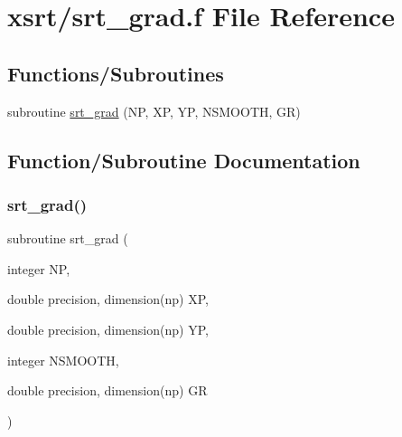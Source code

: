 \hypertarget{srt__grad_8f}{}\section{xsrt/srt\+\_\+grad.f File Reference}
\label{srt__grad_8f}
\subsection*{Functions/\+Subroutines}
\begin{DoxyCompactItemize}
\item 
subroutine \hyperlink{srt__grad_8f_a52c2cfa91858ed4f6dd6f4f4f5139b69}{srt\+\_\+grad} (NP, XP, YP, N\+S\+M\+O\+O\+TH, GR)
\end{DoxyCompactItemize}


\subsection{Function/\+Subroutine Documentation}
\mbox{\label{srt__grad_8f_a52c2cfa91858ed4f6dd6f4f4f5139b69}} 
\subsubsection{\texorpdfstring{srt\+\_\+grad()}{srt\_grad()}}
{\footnotesize\ttfamily subroutine srt\+\_\+grad (\begin{DoxyParamCaption}\item[{integer}]{NP,  }\item[{double precision, dimension(np)}]{XP,  }\item[{double precision, dimension(np)}]{YP,  }\item[{integer}]{N\+S\+M\+O\+O\+TH,  }\item[{double precision, dimension(np)}]{GR }\end{DoxyParamCaption})}

